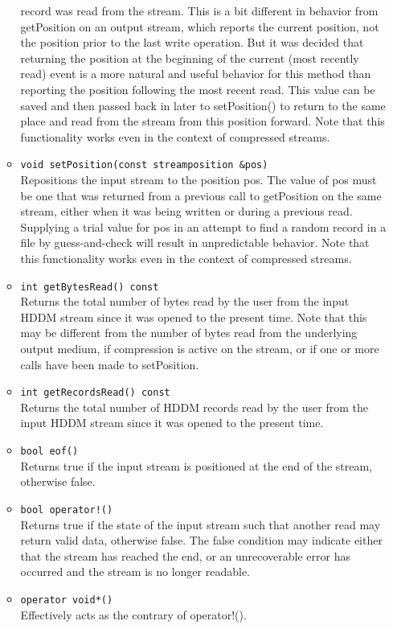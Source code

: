 \documentclass{revtex4}
\begin{document}
\begin{itemize}
\begin{itemize}
record was read from the stream. This is a bit different in behavior from 
getPosition on an output stream, which reports the current position, not the
position prior to the last write operation. But it was decided that returning
the position at the beginning of the current (most recently read) event is a
more natural and useful behavior for this method than reporting the position
following the most recent read. This value can be saved and then passed back
in later to setPosition() to return to the same place and read from the stream
from this position forward. Note that this functionality works even in the
context of compressed streams.
\item \texttt{void setPosition(const streamposition \&pos)}\\
Repositions the input stream to the position pos. The value of pos must be one
that was returned from a previous call to getPosition on the same stream, either
when it was being written or during a previous read. Supplying a trial value
for pos in an attempt to find a random record in a file by guess-and-check will
result in unpredictable behavior. Note that this functionality works even in
the context of compressed streams.
\item \texttt{int getBytesRead() const}\\
Returns the total number of bytes read by the user from the input HDDM stream 
since it was opened to the present time. Note that this may be different from
the number of bytes read from the underlying output medium, if compression is
active on the stream, or if one or more calls have been made to setPosition.
\item \texttt{int getRecordsRead() const}\\
Returns the total number of HDDM records read by the user from the input HDDM
stream since it was opened to the present time.
\item \texttt{bool eof()}\\
Returns true if the input stream is positioned at the end of the stream,
otherwise false.
\item \texttt{bool operator!()}\\
Returns true if the state of the input stream such that another read may
return valid data, otherwise false. The false condition may indicate either
that the stream has reached the end, or an unrecoverable error has occurred
and the stream is no longer readable.
\item \texttt{operator void*()}\\
Effectively acts as the contrary of operator!().

\end{itemize}
\end{itemize}
\end{document}
